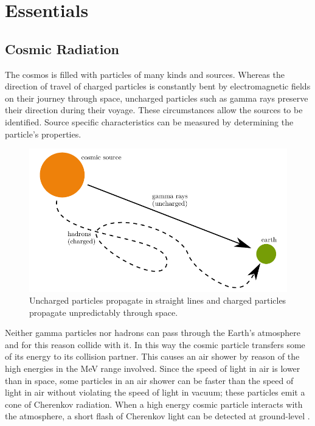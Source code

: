 \chapter{Essentials}


\section{Cosmic Radiation}
The cosmos is filled with particles of many kinds and sources.
Whereas the direction of travel of charged particles is constantly bent by electromagnetic fields on their journey through space,
uncharged particles such as gamma rays preserve their direction during their voyage.
These circumstances allow the sources to be identified.
Source specific characteristics can be measured by determining the particle's properties.

\begin{figure}
    \centering
    \includegraphics[scale=1]{Plots/Cosmic_Radiation.pdf}
    \caption{Uncharged particles propagate in straight lines and charged particles propagate unpredictably through space.}
    \label{fig:cosmic_radiation}
\end{figure}

Neither gamma particles nor hadrons can pass through the Earth's atmosphere and for this reason collide with it.
In this way the cosmic particle transfers some of its energy to its collision partner.
This causes an air shower by reason of the high energies in the \si{\mega\eV} range involved.
Since the speed of light in air is lower than in space,
some particles in an air shower can be faster than the speed of light in air
without violating the speed of light in vacuum;
these particles emit a cone of Cherenkov radiation.
When a high energy cosmic particle interacts with the atmosphere,
a short flash of Cherenkov light can be detected at ground-level \cite{basic_physics}.

